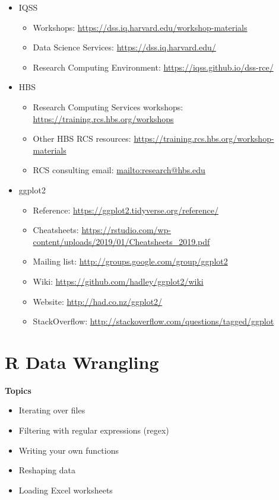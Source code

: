 \documentclass[]{book}
\providecommand{\tightlist}{%
  \setlength{\itemsep}{0pt}\setlength{\parskip}{0pt}}
\begin{document}
\begin{itemize}
\tightlist
\item
  IQSS

  \begin{itemize}
  \tightlist
  \item
    Workshops: \url{https://dss.iq.harvard.edu/workshop-materials}
  \item
    Data Science Services: \url{https://dss.iq.harvard.edu/}
  \item
    Research Computing Environment:
    \url{https://iqss.github.io/dss-rce/}
  \end{itemize}
\item
  HBS

  \begin{itemize}
  \tightlist
  \item
    Research Computing Services workshops:
    \url{https://training.rcs.hbs.org/workshops}
  \item
    Other HBS RCS resources:
    \url{https://training.rcs.hbs.org/workshop-materials}
  \item
    RCS consulting email: \url{mailto:research@hbs.edu}
  \end{itemize}
\item
  ggplot2

  \begin{itemize}
  \tightlist
  \item
    Reference: \url{https://ggplot2.tidyverse.org/reference/}
  \item
    Cheatsheets:
    \url{https://rstudio.com/wp-content/uploads/2019/01/Cheatsheets_2019.pdf}
  \item
    Mailing list: \url{http://groups.google.com/group/ggplot2}
  \item
    Wiki: \url{https://github.com/hadley/ggplot2/wiki}
  \item
    Website: \url{http://had.co.nz/ggplot2/}
  \item
    StackOverflow:
    \url{http://stackoverflow.com/questions/tagged/ggplot}
  \end{itemize}
\end{itemize}

\chapter{R Data Wrangling}\label{r-data-wrangling}

\textbf{Topics}

\begin{itemize}
\tightlist
\item
  Iterating over files
\item
  Filtering with regular expressions (regex)
\item
  Writing your own functions
\item
  Reshaping data
\item
  Loading Excel worksheets
\end{itemize}
\end{document}
